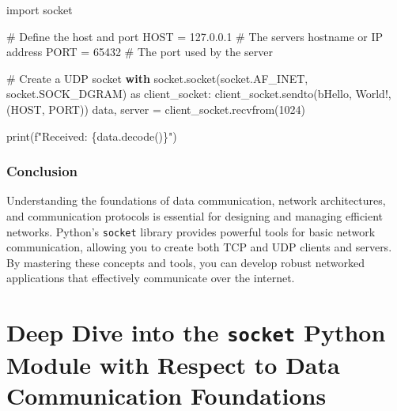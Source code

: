 \documentclass[
  letterpaper,
  DIV=11,
  numbers=noendperiod]{scrreprt}
\newenvironment{Shaded}{\begin{snugshade}}{\end{snugshade}}
\newcommand{\BuiltInTok}[1]{\textcolor[rgb]{0.00,0.23,0.31}{#1}}
\newcommand{\CommentTok}[1]{\textcolor[rgb]{0.37,0.37,0.37}{#1}}
\newcommand{\ControlFlowTok}[1]{\textcolor[rgb]{0.00,0.23,0.31}{\textbf{#1}}}
\newcommand{\DecValTok}[1]{\textcolor[rgb]{0.68,0.00,0.00}{#1}}
\newcommand{\ImportTok}[1]{\textcolor[rgb]{0.00,0.46,0.62}{#1}}
\newcommand{\NormalTok}[1]{\textcolor[rgb]{0.00,0.23,0.31}{#1}}
\newcommand{\OperatorTok}[1]{\textcolor[rgb]{0.37,0.37,0.37}{#1}}
\newcommand{\SpecialCharTok}[1]{\textcolor[rgb]{0.37,0.37,0.37}{#1}}
\newcommand{\SpecialStringTok}[1]{\textcolor[rgb]{0.13,0.47,0.30}{#1}}
\newcommand{\StringTok}[1]{\textcolor[rgb]{0.13,0.47,0.30}{#1}}
\begin{document}
\begin{Shaded}
\begin{Highlighting}[]
\ImportTok{import}\NormalTok{ socket}

\CommentTok{\# Define the host and port}
\NormalTok{HOST }\OperatorTok{=} \StringTok{\textquotesingle{}127.0.0.1\textquotesingle{}}  \CommentTok{\# The server\textquotesingle{}s hostname or IP address}
\NormalTok{PORT }\OperatorTok{=} \DecValTok{65432}        \CommentTok{\# The port used by the server}

\CommentTok{\# Create a UDP socket}
\ControlFlowTok{with}\NormalTok{ socket.socket(socket.AF\_INET, socket.SOCK\_DGRAM) }\ImportTok{as}\NormalTok{ client\_socket:}
\NormalTok{    client\_socket.sendto(}\StringTok{b\textquotesingle{}Hello, World!\textquotesingle{}}\NormalTok{, (HOST, PORT))}
\NormalTok{    data, server }\OperatorTok{=}\NormalTok{ client\_socket.recvfrom(}\DecValTok{1024}\NormalTok{)}

\BuiltInTok{print}\NormalTok{(}\SpecialStringTok{f"Received: }\SpecialCharTok{\{}\NormalTok{data}\SpecialCharTok{.}\NormalTok{decode()}\SpecialCharTok{\}}\SpecialStringTok{"}\NormalTok{)}
\end{Highlighting}
\end{Shaded}

\subsection{Conclusion}\label{conclusion-41}

Understanding the foundations of data communication, network
architectures, and communication protocols is essential for designing
and managing efficient networks. Python's \texttt{socket} library
provides powerful tools for basic network communication, allowing you to
create both TCP and UDP clients and servers. By mastering these concepts
and tools, you can develop robust networked applications that
effectively communicate over the internet.


\chapter{\texorpdfstring{Deep Dive into the \texttt{socket} Python
Module with Respect to Data Communication
Foundations}{Deep Dive into the socket Python Module with Respect to Data Communication Foundations}}\label{deep-dive-into-the-socket-python-module-with-respect-to-data-communication-foundations}
\end{document}
